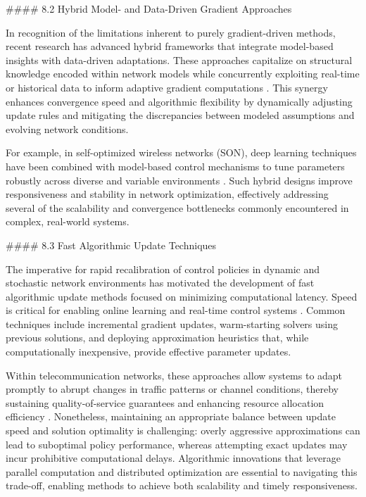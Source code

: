 \documentclass[11pt]{article}
\begin{document}
\begin{itemize}
#### 8.2 Hybrid Model- and Data-Driven Gradient Approaches

In recognition of the limitations inherent to purely gradient-driven methods, recent research has advanced hybrid frameworks that integrate model-based insights with data-driven adaptations. These approaches capitalize on structural knowledge encoded within network models while concurrently exploiting real-time or historical data to inform adaptive gradient computations \cite{ref5,ref7,ref13}. This synergy enhances convergence speed and algorithmic flexibility by dynamically adjusting update rules and mitigating the discrepancies between modeled assumptions and evolving network conditions.

For example, in self-optimized wireless networks (SON), deep learning techniques have been combined with model-based control mechanisms to tune parameters robustly across diverse and variable environments \cite{ref1}. Such hybrid designs improve responsiveness and stability in network optimization, effectively addressing several of the scalability and convergence bottlenecks commonly encountered in complex, real-world systems.

#### 8.3 Fast Algorithmic Update Techniques

The imperative for rapid recalibration of control policies in dynamic and stochastic network environments has motivated the development of fast algorithmic update methods focused on minimizing computational latency. Speed is critical for enabling online learning and real-time control systems \cite{ref2,ref3,ref6,ref8,ref9,ref11,ref15,ref16}. Common techniques include incremental gradient updates, warm-starting solvers using previous solutions, and deploying approximation heuristics that, while computationally inexpensive, provide effective parameter updates.

Within telecommunication networks, these approaches allow systems to adapt promptly to abrupt changes in traffic patterns or channel conditions, thereby sustaining quality-of-service guarantees and enhancing resource allocation efficiency \cite{ref10}. Nonetheless, maintaining an appropriate balance between update speed and solution optimality is challenging: overly aggressive approximations can lead to suboptimal policy performance, whereas attempting exact updates may incur prohibitive computational delays. Algorithmic innovations that leverage parallel computation and distributed optimization are essential to navigating this trade-off, enabling methods to achieve both scalability and timely responsiveness.


\end{itemize}
\end{document}

